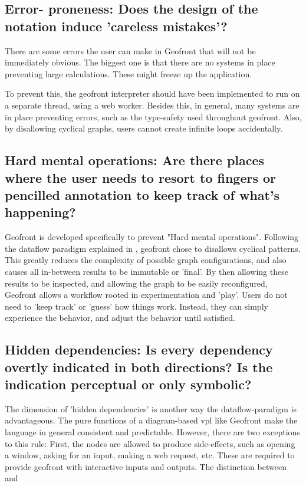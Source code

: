 \subsection*{Error- proneness: Does the design of the notation induce 'careless mistakes'?}

There are some errors the user can make  in Geofront that will not be immediately obvious. 
The biggest one is that there are no systems in place preventing large calculations. 
These might freeze up the application. 

To prevent this, the geofront interpreter should have been implemented to run on a separate thread, using a web worker. 
Besides this, in general, many systems are in place preventing errors, such as the type-safety used throughout geofront.
Also, by disallowing cyclical graphs, users cannot create infinite loops accidentally.

\subsection*{Hard mental operations: Are there places where the user needs to resort to fingers or pencilled annotation to keep track of what's happening?}

Geofront is developed specifically to prevent "Hard mental operations".
Following the dataflow paradigm explained in , geofront chose to disallows cyclical patterns. 
This greatly reduces the complexity of possible graph configurations, and also causes all in-between results to be immutable or 'final'.
By then allowing these results to be inspected, and allowing the graph to be easily reconfigured, Geofront allows a workflow rooted in experimentation and 'play'.
Users do not need to 'keep track' or 'guess' how things work.
Instead, they can simply experience the behavior, and adjust the behavior until satisfied. 



\subsection*{Hidden dependencies: Is every dependency overtly indicated in both directions? Is the indication perceptual or only symbolic?}

The dimension of 'hidden dependencies' is another way the dataflow-paradigm is advantageous. 
The pure functions of a diagram-based vpl like Geofront make the language in general consistent and predictable.
However, there are two exceptions to this rule:
First, the  nodes are allowed to produce side-effects, such as opening a window, asking for an input, making a web request, etc. 
These are required to provide geofront with interactive inputs and outputs.
The distinction between  and \m{}

